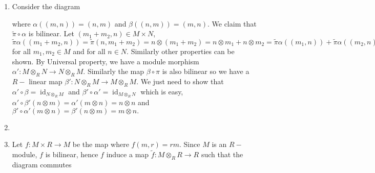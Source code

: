 \documentclass[11pt]{amsart}
\DeclareMathOperator{\id}{\text{id}}
\begin{document}
\proof \begin{enumerate}
\item Consider the diagram 

\begin{center}
\end{center}

where $\alpha((m,n))=(n,m)$ and $\beta((n,m))=(m,n).$ We claim that $\tilde{\pi}\circ\alpha$ is bilinear. Let $(m_1+m_2,n)\in M\times N$, $\tilde{\pi}\alpha((m_1+m_2,n))=\tilde{\pi}(n,m_1+m_2)=n\otimes (m_1+m_2)=n\otimes m_1+n\otimes m_2=\tilde{\pi}\alpha((m_1,n))+\tilde{\pi}\alpha((m_2,n))$ for all $m_1,m_2\in M$ and for all $n\in N.$ Similarly other properties can be shown. By Universal property, we have a module morphism $\alpha':M\otimes_R N\to N\otimes_R M.$ Similarly the map $\beta\circ \pi$ is also bilinear so we have a $R-$ linear map $\beta':N\otimes_R M\to M\otimes_R M.$ We just need to show that $\alpha'\circ \beta=\id_{N\otimes_R M}$ and $\beta'\circ \alpha'=\id_{M\otimes_R N}$ which is easy, $\alpha'\circ \beta'(n\otimes m)=\alpha'(m\otimes n)=n\otimes n$ and $\beta'\circ \alpha'(m\otimes n)=\beta'(n\otimes m)=m\otimes n.$

\item 

\item Let $f:M\times R\to M$ be the map where $f(m,r)=rm.$ Since $M$ is an $R-$module, $f$ is bilinear, hence $f$ induce a map $\tilde{f}:M\otimes_R R\to R$ such that the diagram commutes

\begin{center}
\end{center}


\end{enumerate}
\end{document}
